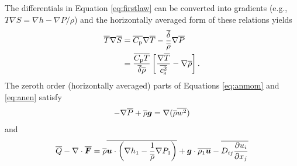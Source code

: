 \documentclass[12pt]{article}
\newcommand{\vecf}{\bm{F}}
\newcommand{\deltaref}{\overline{\delta}}
\newcommand{\cpref}{\overline{\cpcap}}
\newcommand{\cssqref}{\overline{\cs^2}}
\begin{document}
  The differentials in Equation \eqref{eq:firstlaw} can be converted into gradients (e.g., $T\nabla S= \nabla h - \nabla P/\rho$) and the horizontally averaged form of these relations yields 
  \begin{subequations}
  \begin{align}
  	\tmpref\nabla\sref &= \cpref\nabla\tmpref - \frac{\deltaref}{\rhoref}\nabla\prsref\\
  	 &= \frac{\cpref\tmpref}{\deltaref\rhoref}\left[\frac{\nabla\tmpref}{\cssqref}-\nabla\rhoref\right].
  \end{align}
  \end{subequations}
  The zeroth order (horizontally averaged) parts of Equations \eqref{eq:anmom} and \eqref{eq:anen} satisfy 
  \begin{align}
  	-\nabla\overline{P} + \overline{\rho}\bm{g} = \nabla(\overline{\rho} \overline{w^2})
  \end{align}
  and
  \begin{align}
  	\qref - \Div\overline{\vecf} = \rhoref\overline{\vecu\cdot\left(\nabla h_1-\frac{1}{\rhoref}\nabla P_1\right)} + \vecg\cdot\overline{\rho_1\vecu} - \overline{D_{ij}\pderiv{u_i}{x_j}}
  \end{align}
	\newpage
		
\end{document}
